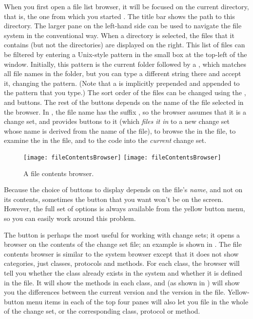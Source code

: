 \documentclass[a4paper,10pt,twoside]{book}
\begin{document}
When you first open a file list browser, it will be focused on the current directory, that is, the one from which you started \sq.
The title bar shows the path to this directory.
The larger pane on the left-hand side can be used to navigate the file system in the conventional way.
When a directory is selected, the files that it contains (but not the directories) are displayed on the right.
This list of files can be filtered by entering a Unix-style pattern in the small box at the top-left of the window.
Initially, this pattern is the current folder followed by a \ct{*}, which matches all file names in the folder, but you can type a different string there and accept it, changing the pattern.
(Note that a \ct{*} is implicitly prepended and appended to the pattern that you type.)
The sort order of the files can be changed using the ,  and  buttons.
The rest of the buttons depends on the name of the file selected in the browser.
In , the file name has the suffix , so the browser assumes that it is a change set, and provides buttons to  it (which \textit{files it in} to a new change set whose name is derived from the name of the file), to browse the  in the file, to examine the  in the file, and to  the code into the \emph{current} change set.

\begin{figure}[btp]
	\begin{center}
	\ifluluelse
		{\texttt{[image: fileContentsBrowser]}}
		{\texttt{[image: fileContentsBrowser]}}
	\end{center}
	\caption{A file contents browser.}
	\label{fig:fileContentsBrowser}
\end{figure}

Because the choice of buttons to display depends on the file's \emph{name}, and not on its contents, sometimes the button that you want won't be on the screen.
However, the full set of options is always available from the yellow button  menu, so you can easily work around this problem.

The  button is perhaps the most useful for working with change sets; it opens a browser on the contents of the change set file; an example is shown in .
The file contents browser is similar to the system browser except that it does not show categories, just classes, protocols and methods.
For each class, the browser will tell you whether the class already exists in the system and whether it is defined in the file.
It will show the methods in each class, and (as shown in ) will show you the differences between the current version and the version in the file.
Yellow-button menu items in each of the top four panes will also let you file in the whole of the change set, or the corresponding class, protocol or method.
\end{document}
